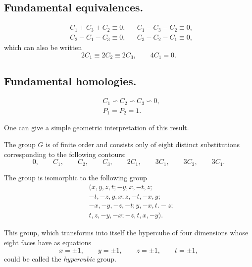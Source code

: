 \documentclass{article}
\begin{document}
\subsection*{Fundamental equivalences.}

\[ \begin{aligned} &C_{1} + C_{3} + C_{2} \equiv 0, &&C_{1} - C_{3} - C_{2} \equiv 0,\\ &C_{2} - C_{1} - C_{3} \equiv 0, &&C_{3} - C_{2} - C_{1} \equiv 0, \end{aligned} \]
which can also be written
\[ 2C_{1} \equiv 2C_{2} \equiv 2C_{3}, \qquad 4C_{1} = 0. \]

\subsection*{Fundamental homologies.}

\[ \begin{aligned} &C_{1} \backsim C_{2} \backsim C_{3} \backsim 0,\\ &P_{1} = P_{2} = 1. \end{aligned} \]

One can give a simple geometric interpretation of this result.

The group $G$ is of finite order and consists only of eight
distinct substitutions corresponding to the following contours:
\[ 0, \qquad C_{1}, \qquad C_{2}, \qquad C_{3}, \qquad 2C_{1}, \qquad 3C_{1}, \qquad 3C_{2}, \qquad 3C_{1}. \]

The group is isomorphic to the following group
\[ \begin{aligned} &(x, y, z, t; -y, x, -t, z;\\ &-t, -z, y, x; z, -t, -x, y;\\ &-x, -y, -z, -t; y, -x, t. -z;\\ &t, z, -y, -x; -z, t, x, -y). \end{aligned} \]

This group, which transforms into itself the hypercube of four dimensions whose eight faces have as equations
\[ x = \pm 1, \qquad y = \pm 1, \qquad z = \pm 1, \qquad t = \pm 1, \]
could be called the \emph{hypercubic} group.
\end{document}
